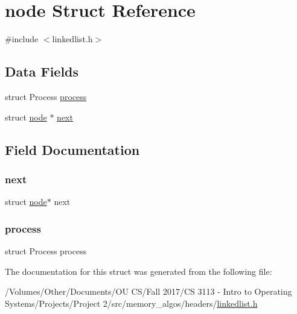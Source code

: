 \hypertarget{structnode}{}\section{node Struct Reference}
\label{structnode}


{\ttfamily \#include $<$linkedlist.\+h$>$}

\subsection*{Data Fields}
\begin{DoxyCompactItemize}
\item 
struct Process \hyperlink{structnode_ac6a2b17930555d517fe4f9f0a9ab39b2}{process}
\item 
struct \hyperlink{structnode}{node} $\ast$ \hyperlink{structnode_a0dc1b6470487aa86d9936e3cab8b95be}{next}
\end{DoxyCompactItemize}


\subsection{Field Documentation}
\mbox{\label{structnode_a0dc1b6470487aa86d9936e3cab8b95be}} 
\subsubsection{\texorpdfstring{next}{next}}
{\footnotesize\ttfamily struct \hyperlink{structnode}{node}$\ast$ next}

\mbox{\label{structnode_ac6a2b17930555d517fe4f9f0a9ab39b2}} 
\subsubsection{\texorpdfstring{process}{process}}
{\footnotesize\ttfamily struct Process process}



The documentation for this struct was generated from the following file\+:\begin{DoxyCompactItemize}
\item 
/\+Volumes/\+Other/\+Documents/\+O\+U C\+S/\+Fall 2017/\+C\+S 3113 -\/ Intro to Operating Systems/\+Projects/\+Project 2/src/memory\+\_\+algos/headers/\hyperlink{linkedlist_8h}{linkedlist.\+h}\end{DoxyCompactItemize}
